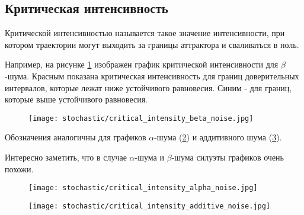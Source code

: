 \subsection{Критическая интенсивность}

        Критической интенсивностью называется такое значение интенсивности, при котором траектории могут выходить за границы аттрактора и сваливаться в ноль.

        Например, на рисунке \ref{critical_intensity_beta_noise} изображен график критической интенсивности для \(\beta\)-шума. Красным показана критическая интенсивность для границ доверительных интервалов, которые лежат ниже устойчивого равновесия. Синим - для границ, которые выше устойчивого равновесия. 



        \begin{figure}
            \centering
            \texttt{[image: stochastic/critical\_intensity\_beta\_noise.jpg]}
        
            \captionsetup{justification=centering}
            \caption{}
            \label{critical_intensity_beta_noise}
        \end{figure}
        
        Обозначения аналогичны для графиков \(\alpha\)-шума (\ref{critical_intensity_alpha_noise}) и аддитивного шума (\ref{critical_intensity_additive_noise}).

        Интересно заметить, что в случае \(\alpha\)-шума и \(\beta\)-шума силуэты графиков очень похожи.

        \begin{figure}
            \centering
            \texttt{[image: stochastic/critical\_intensity\_alpha\_noise.jpg]}
        
            \captionsetup{justification=centering}
            \caption{}
            \label{critical_intensity_alpha_noise}
        \end{figure}

        \begin{figure}
            \centering
            \texttt{[image: stochastic/critical\_intensity\_additive\_noise.jpg]}
        
            \captionsetup{justification=centering}
            \caption{}
            \label{critical_intensity_additive_noise}
        \end{figure}

